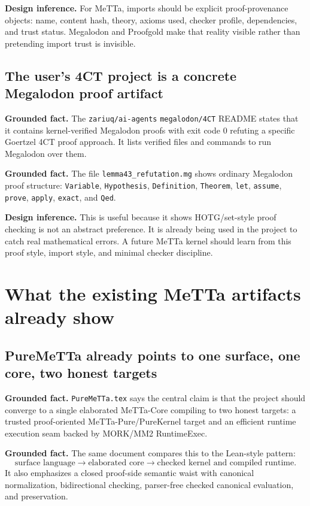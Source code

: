 \documentclass[11pt]{article}
\newcommand{\MeTTa}{\textup{MeTTa}}
\newcommand{\Megalodon}{\textup{Megalodon}}
\newcommand{\HOTG}{\textup{HOTG}}
\newcommand{\Lean}{\textup{Lean}}
\newcommand{\code}[1]{\texttt{#1}}
\newcommand{\Fact}{\textbf{Grounded fact.}}
\newcommand{\Infer}{\textbf{Design inference.}}
\begin{document}
\Infer{} For \MeTTa{}, imports should be explicit proof-provenance objects: name, content hash, theory, axioms used, checker profile, dependencies, and trust status.  \Megalodon{} and Proofgold make that reality visible rather than pretending import trust is invisible.

\subsection{The user's 4CT project is a concrete Megalodon proof artifact}

\Fact{} The \code{zariuq/ai-agents} \code{megalodon/4CT} README states that it contains kernel-verified Megalodon proofs with exit code 0 refuting a specific Goertzel 4CT proof approach.  It lists verified files and commands to run Megalodon over them.\cite{zariuq-4ct-readme}

\Fact{} The file \code{lemma43\_refutation.mg} shows ordinary Megalodon proof structure: \code{Variable}, \code{Hypothesis}, \code{Definition}, \code{Theorem}, \code{let}, \code{assume}, \code{prove}, \code{apply}, \code{exact}, and \code{Qed}.\cite{zariuq-4ct-lemma}

\Infer{} This is useful because it shows \HOTG{}/set-style proof checking is not an abstract preference.  It is already being used in the project to catch real mathematical errors.  A future \MeTTa{} kernel should learn from this proof style, import style, and minimal checker discipline.

\section{What the existing \MeTTa{} artifacts already show}

\subsection{PureMeTTa already points to one surface, one core, two honest targets}

\Fact{} \code{PureMeTTa.tex} says the central claim is that the project should converge to a single elaborated \MeTTa-Core compiling to two honest targets: a trusted proof-oriented \MeTTa-Pure/PureKernel target and an efficient runtime execution seam backed by MORK/MM2 RuntimeExec.\cite{puremetta}

\Fact{} The same document compares this to the \Lean{}-style pattern:
\[
\text{surface language} \to \text{elaborated core} \to \text{checked kernel and compiled runtime}.
\]
It also emphasizes a closed proof-side semantic waist with canonical normalization, bidirectional checking, parser-free checked canonical evaluation, and preservation.\cite{puremetta}
\end{document}
